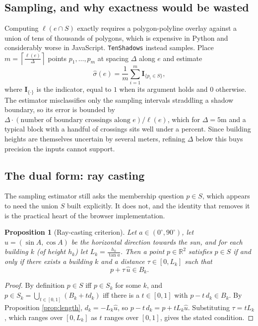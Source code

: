 \documentclass[11pt,a4paper]{article}
\theoremstyle{plain}
\newtheorem{proposition}{Proposition}
\theoremstyle{definition}
\theoremstyle{remark}
\begin{document}
\subsection{Sampling, and why exactness would be wasted}

Computing $\ell(e \cap S)$ exactly requires a polygon-polyline overlay against a union of tens of thousands of polygons, which is expensive in Python and considerably worse in JavaScript. \texttt{TenShadows} instead samples. Place $\displaystyle m = \left\lceil \frac{\ell(e)}{\Delta} \right\rceil$ points $p_1, \dots, p_m$ at spacing $\Delta$ along $e$ and estimate
$$\hat{\sigma}(e) = \frac{1}{m}\sum_{i=1}^{m} \mathbf{I}_{\{p_i \in S\}},$$
where $\mathbf{I}_{\{\cdot\}}$ is the indicator, equal to $1$ when its argument holds and $0$ otherwise. The estimator misclassifies only the sampling intervals straddling a shadow boundary, so its error is bounded by $\Delta \cdot (\text{number of boundary crossings along } e) / \ell(e)$, which for $\Delta = 5$m and a typical block with a handful of crossings sits well under a percent. Since building heights are themselves uncertain by several meters, refining $\Delta$ below this buys precision the inputs cannot support.

\subsection{The dual form: ray casting}

The sampling estimator still asks the membership question $p \in S$, which appears to need the union $S$ built explicitly. It does not, and the identity that removes it is the practical heart of the browser implementation.

\begin{proposition}[Ray-casting criterion]
\label{prop:ray}
Let $a \in (0^\circ, 90^\circ)$, let $\hat{u} = (\sin A, \cos A)$ be the horizontal direction towards the sun, and for each building $k$ (of height $h_k$) let $L_k = \frac{h_k}{\tan a}$. Then a point $p \in \mathbb{R}^2$ satisfies $p \in S$ if and only if there exists a building $k$ and a distance $\tau \in [0, L_k]$ such that
$$p + \tau\,\hat{u} \in B_k.$$
\end{proposition}

\begin{proof}
By definition $p \in S$ iff $p \in S_k$ for some $k$, and $p \in S_k = \bigcup_{t\in[0,1]}(B_k + t d_k)$ iff there is a $t \in [0,1]$ with $p - t\,d_k \in B_k$. By Proposition \ref{prop:length}, $d_k = -L_k \hat{u}$, so $p - t\,d_k = p + t L_k \hat{u}$. Substituting $\tau = t L_k$, which ranges over $[0, L_k]$ as $t$ ranges over $[0,1]$, gives the stated condition.
\end{proof}
\end{document}
